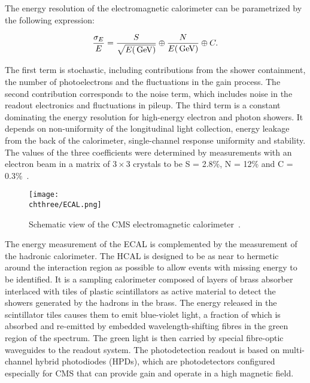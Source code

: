 The energy resolution of the electromagnetic calorimeter can be parametrized by the following expression:

\begin{equation}
\frac{\sigma_E}{E} = \frac{S}{\sqrt{E(\,\text{Ge\hspace{-.08em}V})}} \oplus \frac{N}{E(\,\text{Ge\hspace{-.08em}V})} \oplus C.
\end{equation}

The first term is stochastic, including contributions from the shower containment, the number of photoelectrons and
the fluctuations in the gain process. The second contribution corresponds to the noise term, which includes noise in the readout electronics and fluctuations in pileup.
The third term is a constant dominating the energy resolution for high-energy electron and photon showers. It depends
on non-uniformity of the longitudinal light collection, energy leakage from the back of the calorimeter, single-channel response uniformity and stability. 
The values of the three coefficients were determined by measurements with an electron beam in a matrix of $3\times3$ crystals to be S = 2.8\%, N = 12\% and C = 0.3\%~\cite{1748-0221-2-04-P04004}.\\

\begin{figure}[!htb]
 \begin{center}
  \texttt{[image: \\chthree/ECAL.png]}
 \end{center}
 \caption{Schematic view of the CMS electromagnetic calorimeter~\cite{Chatrchyan:2008zzk}.}
 \label{fig:ECALLayout}
\end{figure}

The energy measurement of the ECAL is complemented by the measurement of the hadronic calorimeter.
The HCAL is designed to be as near to hermetic around the interaction region as possible to allow events with missing energy to be identified.
It is a sampling calorimeter composed of layers of brass absorber interlaced with tiles of plastic scintillators as active material to detect the showers generated by the hadrons in the brass. The energy released in the scintillator tiles causes them to emit blue-violet light, a fraction of which is absorbed and re-emitted by embedded wavelength-shifting fibres in the green region of the spectrum. The green light is then carried by special fibre-optic waveguides to the readout system. The photodetection readout is based on multi-channel hybrid photodiodes (HPDs), which are photodetectors configured especially for CMS that can provide gain and operate in a high magnetic field.

